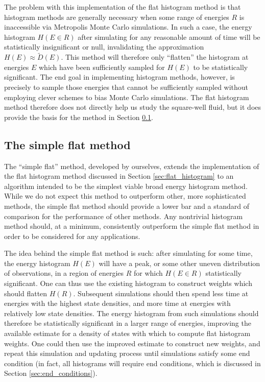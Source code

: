 \documentclass[11pt]{article}
\newcommand{\p}[1]{\left(#1\right)} %
\begin{document}
The problem with this implementation of the flat histogram method is
that histogram methods are generally necessary when some range of
energies $R$ is inaccessible via Metropolis Monte Carlo
simulations. In such a case, the energy histogram $H\p{E\in R}$ after
simulating for any reasonable amount of time will be statistically
insignificant or null, invalidating the approximation
$H\p{E}\approx\tilde D\p{E}$. This method will therefore only
``flatten'' the histogram at energies $E$ which have been sufficiently
sampled for $H\p{E}$ to be statistically significant. The end goal in
implementing histogram methods, however, is precisely to sample those
energies that cannot be sufficiently sampled without employing clever
schemes to bias Monte Carlo simulations. The flat histogram method
therefore does not directly help us study the square-well fluid, but
it does provide the basis for the method in Section
\ref{sec:simple_flat}.

\subsection{The simple flat method}
\label{sec:simple_flat}

The ``simple flat'' method, developed by ourselves, extends the
implementation of the flat histogram method discussed in Section
\ref{sec:flat_histogram} to an algorithm intended to be the simplest
viable broad energy histogram method. While we do not expect this
method to outperform other, more sophisticated methods, the simple
flat method should provide a lower bar and a standard of comparison
for the performance of other methods. Any nontrivial histogram method
should, at a minimum, consistently outperform the simple flat method
in order to be considered for any applications.

The idea behind the simple flat method is such: after simulating for
some time, the energy histogram $H\p{E}$ will have a peak, or some
other uneven distribution of observations, in a region of energies $R$
for which $H\p{E\in R}$ statistically significant. One can thus use
the existing histogram to construct weights which should flatten
$H\p{R}$. Subsequent simulations should then spend less time at
energies with the highest state densities, and more time at energies
with relatively low state densities. The energy histogram from such
simulations should therefore be statistically significant in a larger
range of energies, improving the available estimate for a density of
states with which to compute flat histogram weights. One could then
use the improved estimate to construct new weights, and repeat this
simulation and updating process until simulations satisfy some end
condition (in fact, all histograms will require end conditions, which
is discussed in Section \ref{sec:end_conditions}).
\end{document}
